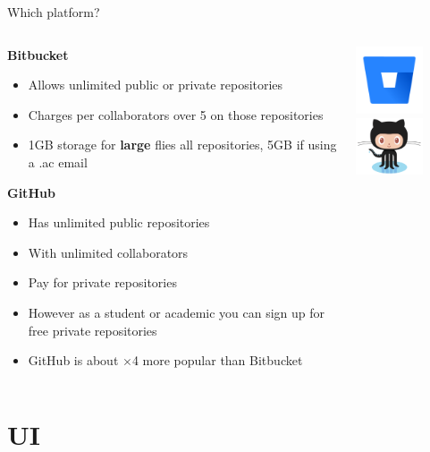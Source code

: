 \documentclass[10pt]{beamer}
\begin{document}
{\begin{frame}[fragile]{Which platform?}
\begin{columns}[T]
\begin{column}{.8\textwidth}
\textbf{Bitbucket}
\begin{itemize}
\item Allows unlimited public or private repositories
\item Charges per collaborators over 5 on those repositories 
\item 1GB storage for \textbf{large} flies all repositories, 5GB if using a .ac email
\end{itemize}
\textbf{GitHub}
\begin{itemize}
\item Has unlimited public repositories 
\item With unlimited collaborators
\item Pay for private repositories
\item However as a student or academic you can sign up for free private repositories
\item GitHub is about $\times$4 more popular than Bitbucket
\end{itemize}
\end{column}
\begin{column}{.2\textwidth}
\includegraphics[width=2cm]{Figs/git/Bitbucket} \newline \newline \newline \newline 
\includegraphics[width=2cm]{Figs/git/Octocat}
\end{column}
\end{columns}
\end{frame}



\section{UI}



}
\end{document}

